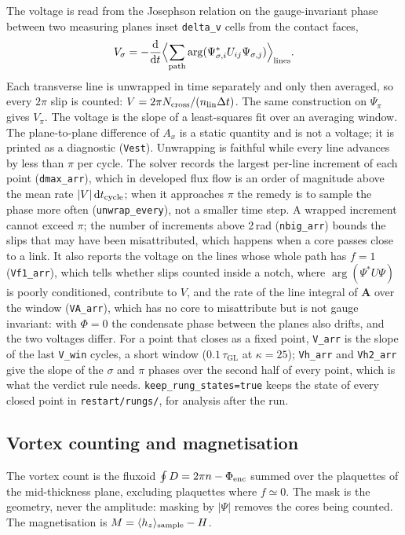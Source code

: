 \documentclass[11pt,a4paper]{article}
\newcommand{\tGL}{\tau_{\mathrm{GL}}}
\newcommand{\code}[1]{\texttt{#1}}
\begin{document}
The voltage is read from the Josephson relation on the gauge-invariant
phase between two measuring planes inset \code{delta\_v} cells from the
contact faces,
\begin{equation}
  V_\sigma=-\frac{\mathrm d}{\mathrm dt}\Bigl\langle\sum_{\rm path}
  \arg(\Psi_{\sigma,i}^*U_{ij}\Psi_{\sigma,j})\Bigr\rangle_{\rm lines}.
\end{equation}
Each transverse line is unwrapped in time separately and only then
averaged, so every $2\pi$ slip is counted: $V=2\pi N_{\rm cross}/(n_{\rm lin}\Delta t)$.
The same construction on $\Psi_\pi$ gives $V_\pi$. The voltage is the slope
of a least-squares fit over an averaging window. The plane-to-plane
difference of $A_x$ is a static quantity and is not a voltage; it is
printed as a diagnostic (\code{Vest}). Unwrapping is faithful while every
line advances by less than $\pi$ per cycle. The solver records the largest
per-line increment of each point (\code{dmax\_arr}), which in developed flux
flow is an order of magnitude above the mean rate $|V|\,\mathrm dt_{\rm cycle}$;
when it approaches $\pi$ the remedy is to sample the phase more often
(\code{unwrap\_every}), not a smaller time step. A wrapped increment cannot
exceed $\pi$; the number of increments above 2\,rad (\code{nbig\_arr})
bounds the slips that may have been misattributed, which happens when a
core passes close to a link. It also reports the voltage on the lines whose
whole path has $f=1$ (\code{Vf1\_arr}), which tells whether slips counted
inside a notch, where $\arg(\Psi^*U\Psi)$ is poorly conditioned, contribute
to $V$, and the rate of the line integral of $\mathbf A$ over the window
(\code{VA\_arr}), which has no core to misattribute but is not gauge
invariant: with $\Phi=0$ the condensate phase between the planes also
drifts, and the two voltages differ. For a point that closes as a fixed
point, \code{V\_arr} is the slope of the last \code{V\_win} cycles, a
short window ($0.1\,\tGL$ at $\kappa=25$); \code{Vh\_arr} and
\code{Vh2\_arr} give the slope of the $\sigma$ and $\pi$ phases over the
second half of every point, which is what the verdict rule needs.
\code{keep\_rung\_states=true} keeps
the state of every closed point in \code{restart/rungs/}, for analysis after
the run.

\subsection{Vortex counting and magnetisation}

The vortex count is the fluxoid $\oint D=2\pi n-\Phi_{\rm enc}$ summed over
the plaquettes of the mid-thickness plane, excluding plaquettes where
$f\simeq0$. The mask is the geometry, never the amplitude: masking by
$|\Psi|$ removes the cores being counted. The magnetisation is
$M=\langle h_z\rangle_{\rm sample}-H$.
\end{document}
